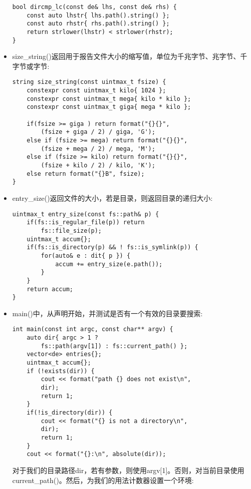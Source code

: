 \begin{itemize}
\begin{lstlisting}[style=styleCXX]
bool dircmp_lc(const de& lhs, const de& rhs) {
	const auto lhstr{ lhs.path().string() };
	const auto rhstr{ rhs.path().string() };
	return strlower(lhstr) < strlower(rhstr);
}
\end{lstlisting}

\item 
size\_string()返回用于报告文件大小的缩写值，单位为千兆字节、兆字节、千字节或字节:

\begin{lstlisting}[style=styleCXX]
string size_string(const uintmax_t fsize) {
	constexpr const uintmax_t kilo{ 1024 };
	constexpr const uintmax_t mega{ kilo * kilo };
	constexpr const uintmax_t giga{ mega * kilo };
	
	if(fsize >= giga ) return format("{}{}",
		(fsize + giga / 2) / giga, 'G');
	else if (fsize >= mega) return format("{}{}",
		(fsize + mega / 2) / mega, 'M');
	else if (fsize >= kilo) return format("{}{}",
		(fsize + kilo / 2) / kilo, 'K');
	else return format("{}B", fsize);
}
\end{lstlisting}

\item 
entry\_size()返回文件的大小，若是目录，则返回目录的递归大小:

\begin{lstlisting}[style=styleCXX]
uintmax_t entry_size(const fs::path& p) {
	if(fs::is_regular_file(p)) return
		fs::file_size(p);
	uintmax_t accum{};
	if(fs::is_directory(p) && ! fs::is_symlink(p)) {
		for(auto& e : dit{ p }) {
			accum += entry_size(e.path());
		}
	}
	return accum;
}
\end{lstlisting}

\item 
main()中，从声明开始，并测试是否有一个有效的目录要搜索:

\begin{lstlisting}[style=styleCXX]
int main(const int argc, const char** argv) {
	auto dir{ argc > 1 ?
		fs::path(argv[1]) : fs::current_path() };
	vector<de> entries{};
	uintmax_t accum{};
	if (!exists(dir)) {
		cout << format("path {} does not exist\n",
		dir);
		return 1;
	}
	if(!is_directory(dir)) {
		cout << format("{} is not a directory\n",
		dir);
		return 1;
	}
	cout << format("{}:\n", absolute(dir));
\end{lstlisting}

对于我们的目录路径dir，若有参数，则使用argv[1]。否则，对当前目录使用current\_path()。然后，为我们的用法计数器设置一个环境:


\end{itemize}

